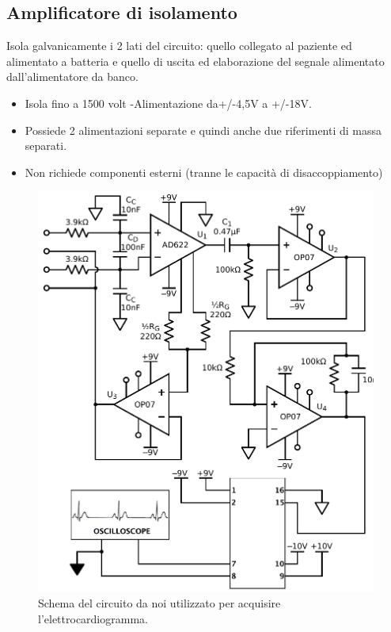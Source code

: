 \subsection{Amplificatore di isolamento}
Isola galvanicamente i 2 lati del circuito: quello collegato al paziente ed alimentato a batteria e quello di uscita ed elaborazione del segnale alimentato dall’alimentatore da
banco.
\begin{itemize}
	\item Isola fino a 1500 volt -Alimentazione da+/-4,5V a +/-18V.
	\item Possiede 2 alimentazioni separate e quindi anche due riferimenti di massa separati.
	\item Non richiede componenti esterni (tranne le capacità di disaccoppiamento)
\end{itemize}


\begin{figure}[tpc]
\centering
\includegraphics[width=.7\textwidth]{../E07/latex/circuito.pdf}
\caption{Schema del circuito da noi utilizzato per acquisire l'elettrocardiogramma.}
\label{cir8:compensation}
\end{figure}
